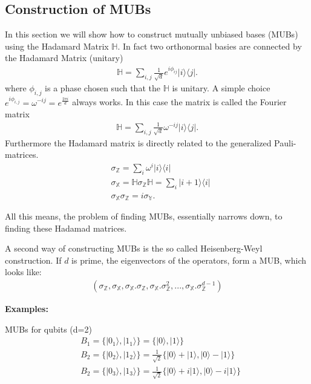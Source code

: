 \documentclass[a4paper]{article}
\begin{document}
\subsection{Construction of MUBs \label{sec:mubs}}
In this section we will show how to construct mutually unbiased bases (MUBs)
using the Hadamard Matrix $\mathbb{H}$. In fact two orthonormal basies are
connected by the Hadamard Matrix (unitary)
\begin{align}
    \mathbb{H}=\sum_{i,j} \frac{1}{\sqrt{d}} e^{i\phi_{ij}}|i\rangle\langle j|.
\end{align}
where $\phi_{i,j}$ is a phase chosen such that the $\mathbb{H}$ is unitary. A
simple choice $e^{i\phi_{i,j}} = \omega^{-ij} = e^{\frac{2\pi i}{d}}$ always
works. In this case the matrix is called the Fourier matrix
\begin{align}
    \mathbb{H}=\sum_{i,j} \frac{1}{\sqrt{d}} \omega^{-ij}|i\rangle\langle j|.
\end{align}
Furthermore the Hadamard matrix is directly related to the generalized
Pauli-matrices.
\begin{align}
    &\sigma_{\mathbb{Z}} = \sum_i \omega^i |i\rangle\langle i|\\
    &\sigma_{\mathbb{X}} = \mathbb{H}\sigma_{\mathbb{Z}} \mathbb{H} = \sum_i
    |i+1\rangle\langle i|\\
    &\sigma_{\mathbb{X}}\sigma_{\mathbb{Z}} = i \sigma_{\mathbb{Y}}.
\end{align}

All this means, the problem of finding MUBs, essentially narrows down, to finding
these Hadamad matrices.
\newline

A second way of constructing MUBs is the so called Heisenberg-Weyl
construction. If $d$ is prime, the eigenvectors of the operators, form a MUB,
which looks like:
\begin{align}
    (\sigma_\mathbb{Z},\sigma_\mathbb{X},\sigma_\mathbb{X}.
    \sigma_\mathbb{Z},\sigma_\mathbb{X}.\sigma^2_\mathbb{Z},...,\sigma_\mathbb{X}.
    \sigma^{d-1}_\mathbb{Z})
\end{align}

\textbf{Examples:}
\newline

MUBs for qubits (d=2)
\begin{align}
    &B_1 = \{|0_1\rangle, |1_1\rangle\} = \{|0\rangle, |1\rangle\}\\
    &B_2 = \{|0_2\rangle, |1_2\rangle\} = \frac{1}{\sqrt{2}} \{|0\rangle
    +|1\rangle , |0\rangle - |1\rangle\}\\
    &B_2 = \{|0_3\rangle, |1_3\rangle\} = \frac{1}{\sqrt{2}} \{|0\rangle
    +i|1\rangle , |0\rangle - i|1\rangle\}\\
\end{align}
\end{document}
